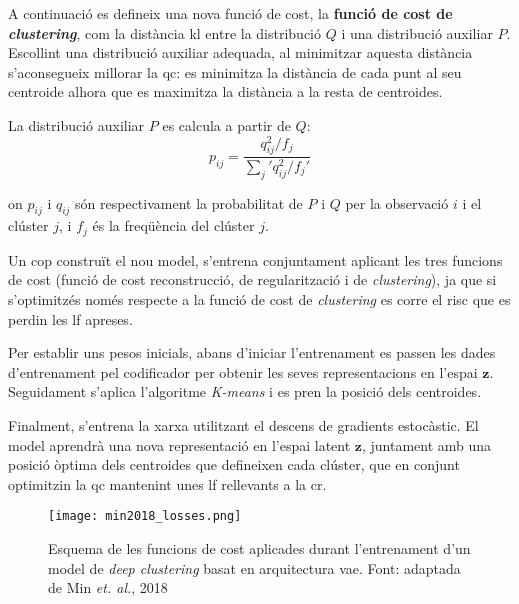 \documentclass[CAT,BIB]{TFUOC}%
\begin{document}
        A continuació es defineix una nova funció de cost,
        la \textbf{funció de cost de \textit{clustering}},
        com la distància \gls{kl} entre la distribució $Q$
        i una distribució auxiliar $P$.
        Escollint una distribució auxiliar adequada,
        al minimitzar aquesta distància
        s'aconsegueix millorar la \gls{qc}:
        es minimitza la distància de cada punt al seu centroide
        alhora que es maximitza la distància a la resta de centroides.

        La distribució auxiliar $P$ es calcula
        a partir de $Q$:
        \begin{equation}
            \label{eq:clustering_aux}
            p_{ij} =
            \frac {q_{ij}^2 / f_j}
                 {\sum_j' q_{ij}^2 / f_j'}
        \end{equation}

        on $p_{ij}$ i $q_{ij}$ són respectivament la probabilitat
        de $P$ i $Q$ per la observació $i$ i el clúster $j$,
        i $f_j$ és la freqüència del clúster $j$.

        Un cop construït el nou model,
        s'entrena conjuntament aplicant les tres funcions de cost
        (funció de cost reconstrucció, de regularització i de \textit{clustering}),
        ja que si s'optimitzés només respecte a la funció de cost de \textit{clustering}
        es corre el risc que es perdin les \gls{lf} apreses.

        Per establir uns pesos inicials,
        abans d'iniciar l'entrenament
        es passen les dades d'entrenament pel codificador
        per obtenir les seves representacions en l'espai $\mathbf{z}$.
        Seguidament s'aplica l'algoritme \textit{K-means}
        i es pren la posició dels centroides.

        Finalment, s'entrena la xarxa utilitzant el descens de gradients estocàstic.
        El model aprendrà una nova representació en l'espai latent $\mathbf{z}$,
        juntament amb una posició òptima dels centroides que defineixen cada clúster,
        que en conjunt optimitzin la \gls{qc}
        mantenint unes \gls{lf} rellevants a la \gls{cr}.

        \begin{figure}
            \centering
            \texttt{[image: min2018\_losses.png]}
            \caption[\textit{Variational autoencoder} + clustering: funcions de cost]{
                Esquema de les funcions de cost
                aplicades durant l'entrenament
                d'un model de \textit{deep clustering}
                basat en arquitectura \gls{vae}.
                Font: adaptada de Min \textit{et. al.}, 2018 \citep{Min2018}
            }
            \label{fig:vae_losses}
        \end{figure}
\end{document}
